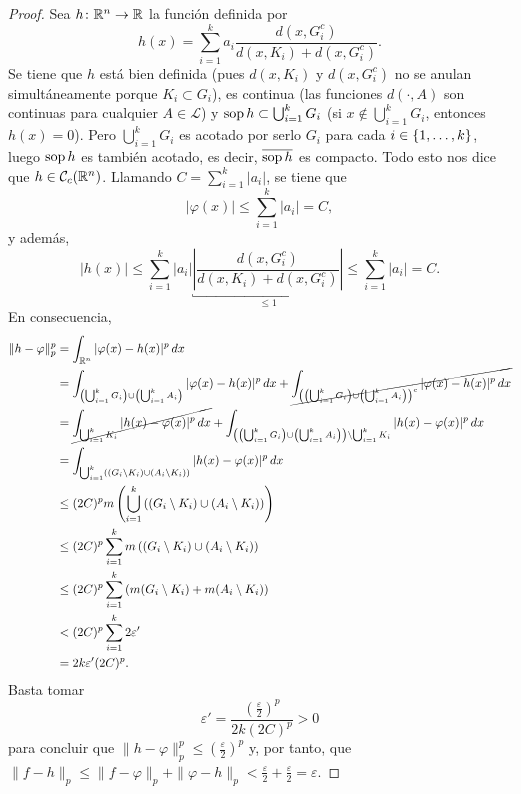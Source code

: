 \documentclass[a4paper, 11pt, oneside]{report}
\begin{document}
\begin{proof}
  Sea $h \colon \mathbb R^n \to \mathbb R$ la función definida por
  \[h(x)=\sum_{i=1}^k a_i \frac{d(x,G_i^c)}{d(x,K_i)+d(x,G_i^c)}.\]
  Se tiene que $h$ está bien definida (pues $d(x,K_i)$ y $d(x,G_i^c)$ no se anulan simultáneamente porque $K_i \subset G_i$), es continua (las funciones $d(\cdot, A)$ son continuas para cualquier $A \in \mathcal{L}$) y $\textup{sop}\, h \subset \bigcup_{i=1}^k G_i$ (si $x \not\in \bigcup_{i=1}^kG_i$, entonces $h(x)=0$). Pero $\bigcup_{i=1}^k G_i$ es acotado por serlo $G_i$ para cada $i \in \{1,\mathellipsis,k\}$, luego $\textup{sop}\, h$ es también acotado, es decir, $\overline{\textup{sop}\, h}$ es compacto. Todo esto nos dice que $h \in \mathcal{C}_c(\mathbb R^n)$. Llamando $C = \sum_{i=1}^k |a_i|$, se tiene que
  \[|\varphi(x)| \leq \sum_{i=1}^k |a_i| = C,\]
  y además,
  \[|h(x)| \leq \sum_{i=1}^k |a_i|\underbracket{\left|\frac{d(x,G_i^c)}{d(x,K_i)+d(x,G_i^c)}\right|}_{\leq 1} \leq \sum_{i=1}^k |a_i|=C.\]
  En consecuencia,
  \[\begin{aligned}[t]
    \|h-\varphi\|_p^p &= \int_{\mathbb R^n} |\varphi(x)-h(x)|^p \,dx \\
    &= \int_{\left(\bigcup_{i=1}^k G_i\right) \cup \left(\bigcup_{i=1}^k A_i\right)}|\varphi(x)-h(x)|^p \, dx + \cancel{\int_{\left(\left(\bigcup_{i=1}^k G_i\right) \cup \left(\bigcup_{i=1}^k A_i\right)\right)^c}|\varphi(x)-h(x)|^p \, dx} \\
    &= \cancel{\int_{\bigcup_{i=1}^k K_i} |h(x)-\varphi(x)|^p \, dx} + \int_{\left(\left(\bigcup_{i=1}^k G_i\right) \cup \left(\bigcup_{i=1}^k A_i\right)\right) \setminus \bigcup_{i=1}^k K_i} |h(x)-\varphi(x)|^p \, dx \\
    &= \int_{\bigcup_{i=1}^k \left((G_i \setminus K_i) \cup (A_i \setminus K_i)\right)} |h(x)-\varphi(x)|^p \, dx \\
    &\leq (2C)^p m\left(\bigcup_{i=1}^k \left((G_i \setminus K_i) \cup (A_i \setminus K_i)\right)\right) \\
    &\leq (2C)^p \sum_{i=1}^k m\left((G_i \setminus K_i) \cup (A_i \setminus K_i)\right) \\
    &\leq (2C)^p \sum_{i=1}^k \left(m(G_i \setminus K_i)+m(A_i \setminus K_i)\right) \\
    &< (2C)^p \sum_{i=1}^k 2\varepsilon' \\
    &= 2k\varepsilon'(2C)^p. 
  \end{aligned}\]
  Basta tomar
  \[\varepsilon' = \frac{(\frac{\varepsilon}{2})^p}{2k(2C)^p} > 0\]
  para concluir que $\|h-\varphi\|_p^p \leq \left(\frac{\varepsilon}{2}\right)^p$ y, por tanto, que $\|f-h\|_p \leq \|f-\varphi\|_p+\|\varphi-h\|_p < \frac{\varepsilon}{2}+\frac{\varepsilon}{2} = \varepsilon$.
\end{proof}
\end{document}
